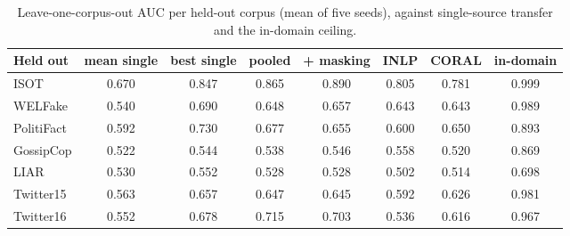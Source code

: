 \begin{table}[h]
\centering
\caption{Leave-one-corpus-out AUC per held-out corpus (mean of five seeds), against single-source transfer and the in-domain ceiling.}\label{tab:repair-targets}
\small
\begin{tabular}{@{}lccccccc@{}}
\toprule
Held out & mean single & best single & pooled & + masking & INLP & CORAL & in-domain \\
\midrule
ISOT & 0.670 & 0.847 & 0.865 & 0.890 & 0.805 & 0.781 & 0.999 \\
WELFake & 0.540 & 0.690 & 0.648 & 0.657 & 0.643 & 0.643 & 0.989 \\
PolitiFact & 0.592 & 0.730 & 0.677 & 0.655 & 0.600 & 0.650 & 0.893 \\
GossipCop & 0.522 & 0.544 & 0.538 & 0.546 & 0.558 & 0.520 & 0.869 \\
LIAR & 0.530 & 0.552 & 0.528 & 0.528 & 0.502 & 0.514 & 0.698 \\
Twitter15 & 0.563 & 0.657 & 0.647 & 0.645 & 0.592 & 0.626 & 0.981 \\
Twitter16 & 0.552 & 0.678 & 0.715 & 0.703 & 0.536 & 0.616 & 0.967 \\
\bottomrule
\end{tabular}
\end{table}
